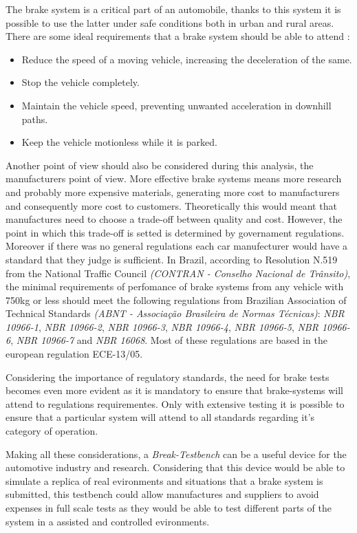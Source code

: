 		The brake system is a critical part of an automobile, thanks to this system it is possible to use the latter under safe conditions both in urban and rural areas. There are some ideal requirements that a brake system should be able to attend \cite{kawaguchi}:

		\begin{itemize}
			\item Reduce the speed of a moving vehicle, increasing the deceleration of the same.
			\item Stop the vehicle completely.
			\item Maintain the vehicle speed, preventing unwanted acceleration in downhill paths.
			\item Keep the vehicle motionless while it is parked.
		\end{itemize}

		\par
		Another point of view should also be considered during this analysis, the manufacturers point of view. More effective brake systems means more research and probably more expensive materials, generating more cost to manufacturers and consequently more cost to customers. Theoretically this would meant that manufactures need to choose a trade-off between quality and cost. However, the point in which this trade-off is setted is determined by governament regulations. Moreover if there was no general regulations each car manufecturer would have a standard that they judge is sufficient. In Brazil, according to Resolution N.519 \cite{contran519} from the National Traffic Council \textit{(CONTRAN - Conselho Nacional de Trânsito)}, the minimal requirements of perfomance of brake systems from any vehicle with 750kg or less should meet the following regulations from Brazilian Association of Technical Standards \textit{(ABNT - Associação Brasileira de Normas Técnicas)}: \textit{NBR 10966-1}, \textit{NBR 10966-2}, \textit{NBR 10966-3}, \textit{NBR 10966-4}, \textit{NBR 10966-5}, \textit{NBR 10966-6}, \textit{NBR 10966-7} and \textit{NBR 16068}. Most of these regulations are based in the european regulation ECE-13/05.
		\par
		Considering the importance of regulatory standards, the need for brake tests becomes even more evident as it is mandatory to ensure that brake-systems will attend to regulations requirementes. Only with extensive testing it is possible to ensure that a particular system will attend to all standards regarding it's category of operation. 
		\par
		Making all these considerations, a \textit{Break-Testbench} can be a useful device for the automotive industry and research. Considering that this device would be able to simulate a replica of real evironments and situations that a brake system is submitted, this testbench could allow manufactures and suppliers to avoid expenses in full scale tests as they would be able to test different parts of the system in a assisted and controlled evironments.